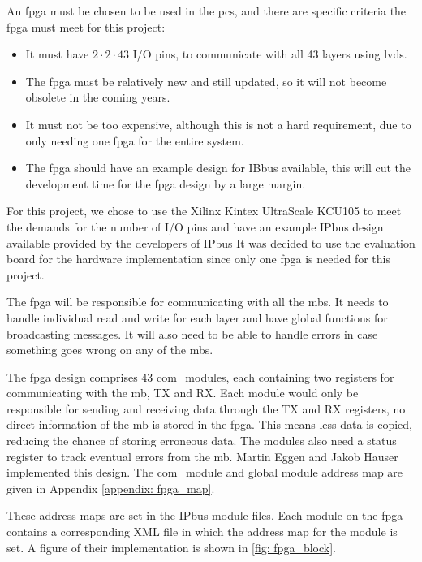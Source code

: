 \documentclass[main.tex]{subfiles}
\begin{document}
An \gls{fpga} must be chosen to be used in the \gls{pcs}, and there are specific criteria the \gls{fpga} must meet for this project:

\begin{itemize}
    \item It must have $2 \cdot 2 \cdot 43$ I/O pins, to communicate with all 43 layers using \acrshort{lvds}.
    \item The \gls{fpga} must be relatively new and still updated, so it will not become obsolete in the coming years.
    \item It must not be too expensive, although this is not a hard requirement, due to only needing one \gls{fpga} for the entire system.
    \item The \gls{fpga} should have an example design for IBbus available, this will cut the development time for the \gls{fpga} design by a large margin.
\end{itemize}

For this project, we chose to use the Xilinx Kintex UltraScale KCU105 to meet the demands for the number of I/O pins and have an example IPbus design available provided by the developers of IPbus  It was decided to use the evaluation board for the hardware implementation since only one \gls{fpga} is needed for this project.

The \gls{fpga} will be responsible for communicating with all the \gls{mb}s. It needs to handle individual read and write for each layer and have global functions for broadcasting messages. It will also need to be able to handle errors in case something goes wrong on any of the \gls{mb}s. 

The \gls{fpga} design comprises 43 com\_modules, each containing two registers for communicating with the \gls{mb}, TX and RX. Each module would only be responsible for sending and receiving data through the TX and RX registers, no direct information of the \gls{mb} is stored in the \gls{fpga}. This means less data is copied, reducing the chance of storing erroneous data. The modules also need a status register to track eventual errors from the \gls{mb}. Martin Eggen and Jakob Hauser implemented this design. The com\_module and global module address map are given in Appendix \ref{appendix: fpga_map}. 

These address maps are set in the IPbus module files. Each module on the \gls{fpga} contains a corresponding XML file in which the address map for the module is set. A figure of their implementation is shown in \autoref{fig: fpga_block}.
\end{document}
